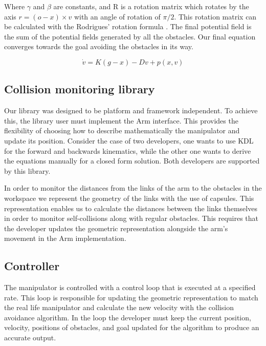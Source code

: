 \documentclass[a4paper, 10pt, conference]{ieeeconf}      %
\begin{document}
Where $\gamma$ and $\beta$ are constants, and R is a rotation matrix which rotates by the axis $r = (o-x) \times v $ with an angle of rotation of $\pi/2$. This rotation matrix can be calculated with the Rodrigues' rotation formula \cite{rodrigues}. The final potential field is the sum of the potential fields generated by all the obstacles. Our final equation converges towards the goal avoiding the obstacles in its way.

\begin{equation}
\dot{v} = K ( g - x ) - D v + p(x, v)
\end{equation}

\subsection{Collision monitoring library} %

Our library was designed to be platform and framework independent. To achieve this, the library user must implement the Arm interface. This provides the flexibility of choosing how to describe mathematically the manipulator and update its position. Consider the case of two developers, one wants to use KDL for the forward and backwards kinematics, while the other one wants to derive the equations manually for a closed form solution. Both developers are supported by this library. 

In order to monitor the distances from the links of the arm to the obstacles in the workspace we represent the geometry of the links with the use of capsules. This representation enables us to calculate the distances between the links themselves in order to monitor self-collisions along with regular obstacles. This requires that the developer updates the geometric representation alongside the arm’s movement in the Arm implementation. 


\subsection{Controller} %

The manipulator is controlled with a control loop that is executed at a specified rate. This loop is responsible for updating the geometric representation to match the real life manipulator and calculate the new velocity with the collision avoidance algorithm. In the loop the developer must keep the current position, velocity, positions of obstacles, and goal updated for the algorithm to produce an accurate output. 
 
\end{document}
